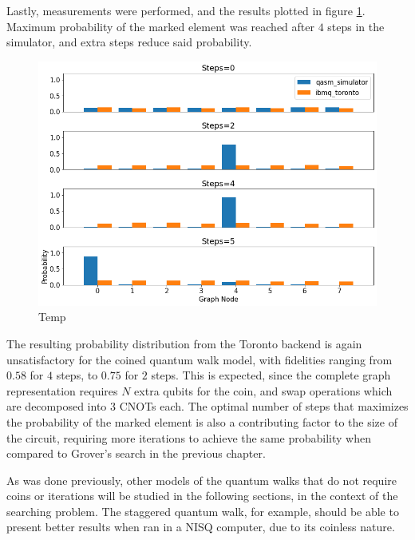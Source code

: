 \documentclass[../../dissertation.tex]{subfiles}
\begin{document}
Lastly, measurements were performed, and the results plotted in figure
\ref{fig:coinedSearchQiskitDist}. Maximum probability of the marked element was
reached after $4$ steps in the simulator, and extra steps reduce said
probability. 
\begin{figure}[!h]
	\centering
	\includegraphics[scale=0.40]{img/Qiskit/CoinedQuantumWalk/Search/CoinedQiskitSearch_N3_M4_S0245}
	\caption{Temp } 
	\label{fig:coinedSearchQiskitDist}
\end{figure}
The resulting probability distribution from the Toronto backend is again
unsatisfactory for the coined quantum walk model, with fidelities ranging from
$0.58$ for $4$ steps, to $0.75$ for $2$ steps. This is expected, since the
complete graph representation requires $N$ extra qubits for the coin, and swap
operations which are decomposed into $3$ CNOTs each. The optimal number of
steps that maximizes the probability of the marked element is also a
contributing factor to the size of the circuit, requiring more iterations to
achieve the same probability when compared to Grover's search in the previous
chapter.\par 

As was done previously, other models of the quantum walks that do
not require coins or iterations will be studied in the following sections, in
the context of the searching problem. The staggered quantum walk, for example,
should be able to present better results when ran in a NISQ computer, due to
its coinless nature.
\end{document}
